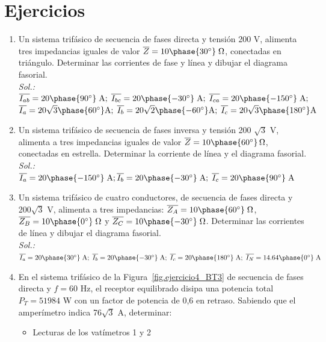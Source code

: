 \section{Ejercicios}
\begin{enumerate}
\item Un sistema trifásico de secuencia de fases directa y tensión 200 V, alimenta tres impedancias iguales de valor $\overline{Z} = 10\phase {30^\circ}\;\Omega$, conectadas en triángulo. Determinar las corrientes de fase y línea y dibujar el diagrama fasorial.\\
  \emph{Sol.: $\overline{I_{ab}}=20\phase{90^\circ}\;\text{A};\; \overline{I_{bc}}=20\phase{-30^\circ}\;\text{A};\; \overline{I_{ca}}=20\phase{-150^\circ}\;\text{A};$\\
    $\overline{I_{a}}=
    {20\sqrt{3}\phase{60^\circ}\text{A}};\;\overline{I_{b}}={20\sqrt{2}\phase{-60^\circ}\text{A}};\;
    \overline{I_{c}}= {20\sqrt{3}\phase{180^\circ}\text{A}}$}
\item Un sistema trifásico de secuencia de fases inversa y tensión 200
  $\sqrt{3}$ V, alimenta a tres impedancias iguales de valor
  $\overline{Z} = 10 \phase{60^\circ} \,\Omega$, conectadas en
  estrella. Determinar la corriente de línea y el diagrama
  fasorial.\\
  \emph{Sol.:
    $\overline{I_{a}}={20\phase{-150^\circ}\;\text{A}};
    \overline{I_{b}}={20\phase{-30^\circ}\;\text{A}};\;\overline{I_{c}}={20\phase{90^\circ}\;\text{A}}$}
\item Un sistema trifásico de cuatro conductores, de secuencia de
  fases directa y 200$\sqrt{3}$ V, alimenta a tres impedancias:
  $\overline{Z_A} = 10 \phase{60^\circ}\;\Omega$,
  $\overline{Z_B} = 10 \phase{0^\circ}\;\Omega$ y
  $\overline{Z_C} = 10 \phase{-30^\circ}\;\Omega$. Determinar las
  corrientes de línea y
  dibujar el diagrama fasorial.\\
  \emph{Sol.:
    $ \overline{I_{a}}={20\phase{30^\circ}\;\text{A}};\;
    \overline{I_{b}}={20\phase{-30^\circ}\;\text{A}};\;
    \overline{I_{c}}={20\phase{180^\circ}\;\text{A}};\;
    \overline{I_{N}}=14.64\phase{0^\circ}\;\text{A}$}
\item En el sistema trifásico de la Figura~\ref{fig.ejercicio4_BT3} de
  secuencia de fases directa y $f=60$ Hz, el receptor equilibrado
  disipa una potencia total $P_T =51984$ W con un factor de potencia
  de 0,6 en retraso. Sabiendo que el amperímetro indica 76$\sqrt{3}$
  A, determinar:
  \begin{itemize}
  \item Lecturas de los vatímetros 1 y 2

\end{itemize}
\end{enumerate}
